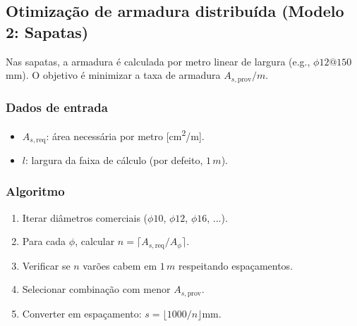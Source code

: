 \subsection{Otimização de armadura distribuída (Modelo 2: Sapatas)}

Nas sapatas, a armadura é calculada por metro linear de largura (e.g., $\phi12@150$\si{mm}). O objetivo é minimizar a taxa de armadura $A_{s,\text{prov}}/m$.

\subsubsection{Dados de entrada}
\begin{itemize}
\item $A_{s,\text{req}}$: área necessária por metro [\si{cm^2/m}].
\item $l$: largura da faixa de cálculo (por defeito, $1\,\si{m}$).
\end{itemize}

\subsubsection{Algoritmo}
\begin{enumerate}
\item Iterar diâmetros comerciais ($\phi10$, $\phi12$, $\phi16$, ...).
\item Para cada $\phi$, calcular $n = \lceil A_{s,\text{req}}/A_\phi \rceil$.
\item Verificar se $n$ varões cabem em $1\,\si{m}$ respeitando espaçamentos.
\item Selecionar combinação com menor $A_{s,\text{prov}}$.
\item Converter em espaçamento: $s = \lfloor 1000/n \rfloor$\si{mm}.
\end{enumerate}
